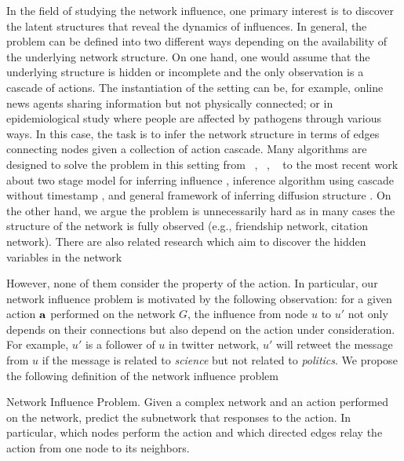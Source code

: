 {In the field of studying the network influence, one primary interest is to discover the latent structures that reveal the dynamics of influences.
In general, the problem can be defined into two different ways depending on the availability of the underlying network structure.
On one hand, one would assume that the underlying structure is hidden or incomplete and the only observation is a cascade of actions.
The instantiation of the setting can be, for example, online news agents sharing information but not physically connected; or in epidemiological study where people are affected by pathogens through various ways.
In this case, the task is to infer the network structure in terms of edges connecting nodes given a collection of action cascade.
Many algorithms are designed to solve the problem in this setting from \netinf\ \citep{GomezRodriguez10inferring}, \netrate\ \citep{Rodrigues11unconvering}, \ \citep{Du12learning} to the most recent work about two stage model for inferring influence \citep{Du14influence}, inference algorithm using cascade without timestamp \citep{Amin14learning}, and general framework of inferring diffusion structure \citep{Daneshmand14estimating}.
On the other hand, we argue the problem is unnecessarily hard as in many cases the structure of the network is fully observed (e.g., friendship network, citation network).
There are also related research which aim to discover the hidden variables in the network \citep{Lovrek08prediction,Goyal10learning}

However, none of them consider the property of the action.
In particular, our network influence problem is motivated by the following observation: for a given action $\mathbf {a}$ performed on the network $G$, the influence from node $u$ to $u'$ not only depends on their connections but also depend on the action under consideration.
For example, $u'$ is a follower of $u$ in twitter network, $u'$ will retweet the message from $u$ if the message is related to \textit{science} but not related to \textit{politics}.
We propose the following definition of the network influence problem
\begin{definition}{Network Influence Problem.}
	Given a complex network and an action performed on the network, predict the subnetwork that responses to the action. In particular, which nodes perform the action and which directed edges relay the action from one node to its neighbors.
\end{definition}

}
